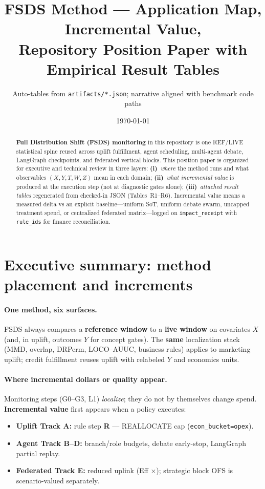 \documentclass[11pt]{article}
\title{\textbf{FSDS Method --- Application Map, Incremental Value,}\\[0.35em]
\large Repository Position Paper with Empirical Result Tables}
\author{Auto-tables from \texttt{artifacts/*.json}; narrative aligned with benchmark code paths}
\date{\today}
\begin{document}
\maketitle

\begin{abstract}
\textbf{Full Distribution Shift (FSDS) monitoring} in this repository is one REF/LIVE statistical spine reused across uplift fulfillment, agent scheduling, multi-agent debate, LangGraph checkpoints, and federated vertical blocks.
This position paper is organized for executive and technical review in three layers:
\textbf{(i)}~\emph{where} the method runs and what observables $(X,Y,T,W,Z)$ mean in each domain;
\textbf{(ii)}~\emph{what incremental value} is produced at the execution step (not at diagnostic gates alone);
\textbf{(iii)}~\emph{attached result tables} regenerated from checked-in JSON (Tables~R1--R6).
Incremental value means a measured delta vs an explicit baseline---uniform SoT, uniform debate swarm, uncapped treatment spend, or centralized federated matrix---logged on \texttt{impact\_receipt} with \texttt{rule\_ids} for finance reconciliation.
\end{abstract}

\section{Executive summary: method placement and increments}

\paragraph{One method, six surfaces.}
FSDS always compares a \textbf{reference window} to a \textbf{live window} on covariates $X$ (and, in uplift, outcomes $Y$ for concept gates).
The \textbf{same} localization stack (MMD, overlap, DRPerm, LOCO--AUUC, business rules) applies to marketing uplift; credit fulfillment reuses uplift with relabeled $Y$ and economics units.

\paragraph{Where incremental dollars or quality appear.}
Monitoring steps (G0--G3, L1) \emph{localize}; they do not by themselves change spend.
\textbf{Incremental value} first appears when a policy executes:
\begin{itemize}[nosep]
  \item \textbf{Uplift Track A:} rule step \textbf{R} --- REALLOCATE cap (\texttt{econ\_bucket=opex}).
  \item \textbf{Agent Track B--D:} branch/role budgets, debate early-stop, LangGraph partial replay.
  \item \textbf{Federated Track E:} reduced uplink (Eff $\times$); strategic block OFS is scenario-valued separately.
\end{itemize}
\end{document}
